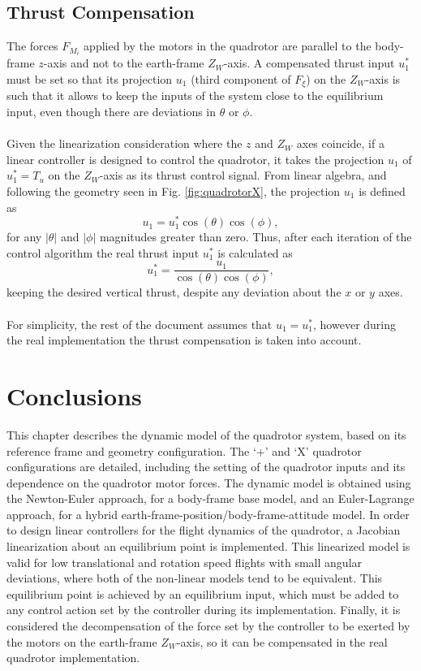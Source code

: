 \subsection{Thrust Compensation}
The forces $F_{M_i}$ applied by the motors in the quadrotor are parallel to the body-frame $z$-axis and not to the earth-frame $Z_W$-axis. A compensated thrust input $u_{1}^{*}$ must be set so that its projection $u_1$ (third component of $F_\xi$) on the $Z_W$-axis is such that it allows to keep the inputs of the system close to the equilibrium input, even though there are deviations in $\theta$ or $\phi$.
\\\\
Given the linearization consideration where the $z$ and $Z_W$ axes coincide, if a linear controller is designed to control the quadrotor, it takes the projection $u_{1}$ of $u_{1}^{*} = T_{u}$ on the $Z_W$-axis as its thrust control signal. From linear algebra, and following the geometry seen in Fig. \ref{fig:quadrotorX}, the projection $u_{1}$ is defined as
\begin{equation}
u_{1} = u_{1}^{*}\cos(\theta)\cos(\phi),
\end{equation}
for any $|\theta|$ and $|\phi|$ magnitudes greater than zero. Thus, after each iteration of the control algorithm the real thrust input $u_{1}^{*}$ is calculated as
\begin{equation}
u_{1}^{*} = \dfrac{u_{1}}{\cos(\theta)\cos(\phi)},
\end{equation}
keeping the desired vertical thrust, despite any deviation about the $x$ or $y$ axes. 
\\\\For simplicity, the rest of the document assumes that $u_1 = u_{1}^{*}$, however during the real implementation the thrust compensation is taken into account.
\section{Conclusions}
This chapter describes the dynamic model of the quadrotor system, based on its reference frame and geometry configuration. The `+' and `X' quadrotor configurations are detailed, including the setting of the quadrotor inputs and its dependence on the quadrotor motor forces. The dynamic model is obtained using the Newton-Euler approach, for a body-frame base model, and an Euler-Lagrange approach, for a hybrid earth-frame-position/body-frame-attitude model. In order to design linear controllers for the flight dynamics of the quadrotor, a Jacobian linearization about an equilibrium point is implemented. This linearized model is valid for low translational and rotation speed flights with small angular deviations, where both of the non-linear models tend to be equivalent. This equilibrium point is achieved by an equilibrium input, which must be added to any control action set by the controller during its implementation.  Finally, it is considered the decompensation of the force set by the controller to be exerted by the motors on the earth-frame $Z_W$-axis, so it can be compensated in the real quadrotor implementation.
